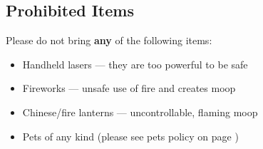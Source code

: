 \subsection*{Prohibited Items} %
Please do not bring \textbf{any} of the following items:

\begin{multicols}{2}
\begin{itemize}[noitemsep]
	\item Handheld lasers --- they are too powerful to be safe
    \item Fireworks --- unsafe use of fire and creates \gls{moop}
    \item Chinese/fire lanterns --- uncontrollable, flaming \gls{moop} 
    \item Pets of any kind (please see pets policy on page \pageref{sub:nopets})
\end{itemize}
\end{multicols}

